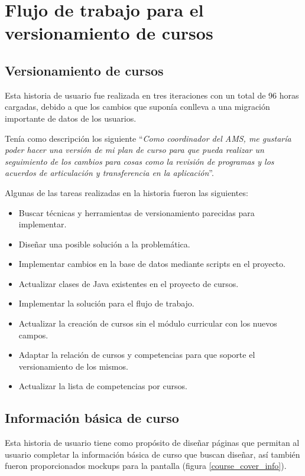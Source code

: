 \section{Flujo de trabajo para el versionamiento de cursos}
\subsection{Versionamiento de cursos}
Esta historia de usuario fue realizada en tres iteraciones con un total de 96 horas cargadas, debido a que los cambios que suponía conlleva a una migración importante de datos de los usuarios.

Tenía como descripción los siguiente \enquote{\textit{Como coordinador del AMS, me gustaría poder hacer una versión de mi plan de curso para que pueda realizar un seguimiento de los cambios para cosas como la revisión de programas y los acuerdos de articulación y transferencia en la aplicación}}.

Algunas de las tareas realizadas en la historia fueron las siguientes:

\begin{itemize}
	\item Buscar técnicas y herramientas de versionamiento parecidas para implementar.
	\item Diseñar una posible solución a la problemática.
	\item Implementar cambios en la base de datos mediante scripts en el proyecto.
	\item Actualizar clases de Java existentes en el proyecto de cursos.
	\item Implementar la solución para el flujo de trabajo.
	\item Actualizar la creación de cursos sin el módulo curricular con los nuevos campos.
	\item Adaptar la relación de cursos y competencias para que soporte el versionamiento de los mismos.
	\item Actualizar la lista de competencias por cursos.
\end{itemize}

\subsection{Información básica de curso}
Esta historia de usuario tiene como propósito de diseñar páginas que permitan al usuario completar la información básica de curso que buscan diseñar, así también fueron proporcionados mockups para la pantalla (figura \ref{course_cover_info}).

